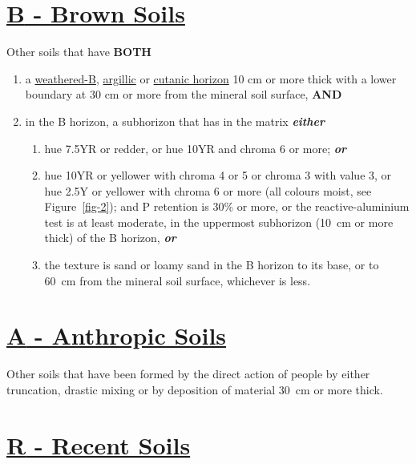 \documentclass[
  letterpaper,
  DIV=11,
  numbers=noendperiod]{scrreprt}
\providecommand{\tightlist}{%
  \setlength{\itemsep}{0pt}\setlength{\parskip}{0pt}}\usepackage{longtable,booktabs,array}
\begin{document}
\hypertarget{sec-B}{%
\section{\texorpdfstring{\protect\hyperlink{sec-ord-B}{\textbf{B} -
Brown Soils}}{B - Brown Soils}}\label{sec-B}}

Other soils that have \textbf{BOTH}

\begin{enumerate}
\def\labelenumi{\arabic{enumi}.}
\tightlist
\item
  a \protect\hyperlink{sec-diag-bw}{weathered-B},
  \protect\hyperlink{sec-diag-argh}{argillic} or
  \protect\hyperlink{sec-diag-cuth}{cutanic horizon} 10 cm or more thick
  with a lower boundary at 30 cm or more from the mineral soil surface,
  \textbf{AND}
\item
  in the B horizon, a subhorizon that has in the matrix
  \textbf{\emph{either}}

  \begin{enumerate}
  \def\labelenumii{(\alph{enumii})}
  \tightlist
  \item
    hue 7.5YR or redder, or hue 10YR and chroma 6 or more;
    \textbf{\emph{or}}
  \item
    hue 10YR or yellower with chroma 4 or 5 or chroma 3 with value 3, or
    hue 2.5Y or yellower with chroma 6 or more (all colours moist, see
    Figure~\ref{fig-2}); and P retention is 30\% or more, or the
    reactive-aluminium test is at least moderate, in the uppermost
    subhorizon (10~cm or more thick) of the B horizon,
    \textbf{\emph{or}}
  \item
    the texture is sand or loamy sand in the B horizon to its base, or
    to 60~cm from the mineral soil surface, whichever is less.
  \end{enumerate}
\end{enumerate}

\hypertarget{sec-A}{%
\section{\texorpdfstring{\protect\hyperlink{sec-ord-A}{\textbf{A} -
Anthropic Soils}}{A - Anthropic Soils}}\label{sec-A}}

Other soils that have been formed by the direct action of people by
either truncation, drastic mixing or by deposition of material 30~cm or
more thick.

\hypertarget{sec-R}{%
\section{\texorpdfstring{\protect\hyperlink{sec-ord-R}{\textbf{R} -
Recent Soils}}{R - Recent Soils}}\label{sec-R}}
\end{document}
